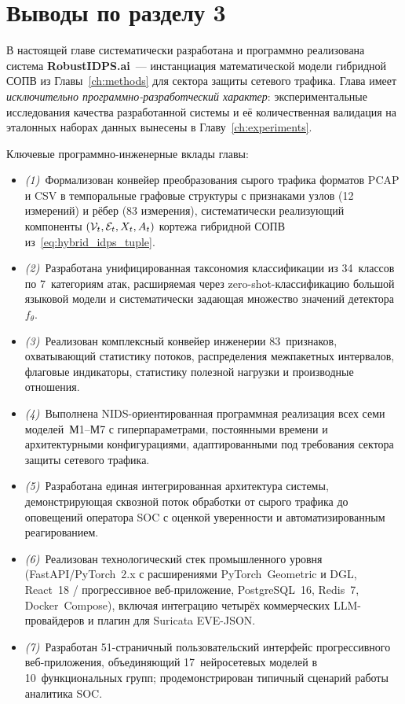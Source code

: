 \section{Выводы по разделу 3}
\label{sec:ch3_summary}

В настоящей главе систематически разработана и программно
реализована система \textbf{RobustIDPS.ai}~--- инстанциация
математической модели гибридной СОПВ из Главы~\ref{ch:methods}
для сектора защиты сетевого трафика. Глава имеет \emph{исключительно
программно-разработческий характер}: экспериментальные исследования
качества разработанной системы и её количественная валидация на
эталонных наборах данных вынесены в Главу~\ref{ch:experiments}.

Ключевые программно-инженерные вклады главы:
\begin{itemize}\setlength\itemsep{2pt}
\item \emph{(1)}~Формализован конвейер преобразования сырого
трафика форматов PCAP и CSV в темпоральные графовые структуры с
признаками узлов (12 измерений) и рёбер (83 измерения),
систематически реализующий компоненты
$(\mathcal{V}_t, \mathcal{E}_t, X_t, A_t)$ кортежа гибридной СОПВ
из~\eqref{eq:hybrid_idps_tuple}.
\item \emph{(2)}~Разработана унифицированная таксономия классификации
из 34~классов по 7~категориям атак, расширяемая через
zero-shot-классификацию большой языковой модели и систематически
задающая множество значений детектора~$f_\theta$.
\item \emph{(3)}~Реализован комплексный конвейер инженерии
83~признаков, охватывающий статистику потоков, распределения
межпакетных интервалов, флаговые индикаторы, статистику полезной
нагрузки и производные отношения.
\item \emph{(4)}~Выполнена NIDS-ориентированная программная
реализация всех семи моделей~М1--М7 с гиперпараметрами,
постоянными времени и архитектурными конфигурациями,
адаптированными под требования сектора защиты сетевого трафика.
\item \emph{(5)}~Разработана единая интегрированная архитектура
системы, демонстрирующая сквозной поток обработки от сырого
трафика до оповещений оператора SOC с оценкой уверенности и
автоматизированным реагированием.
\item \emph{(6)}~Реализован технологический стек промышленного
уровня (FastAPI/PyTorch~2.x с расширениями PyTorch~Geometric и
DGL, React~18 / прогрессивное веб-приложение, PostgreSQL~16,
Redis~7, Docker~Compose), включая интеграцию четырёх коммерческих
LLM-провайдеров и плагин для Suricata EVE-JSON.
\item \emph{(7)}~Разработан 51-страничный пользовательский интерфейс
прогрессивного веб-приложения, объединяющий 17~нейросетевых
моделей в 10~функциональных групп; продемонстрирован типичный
сценарий работы аналитика SOC.
\end{itemize}

